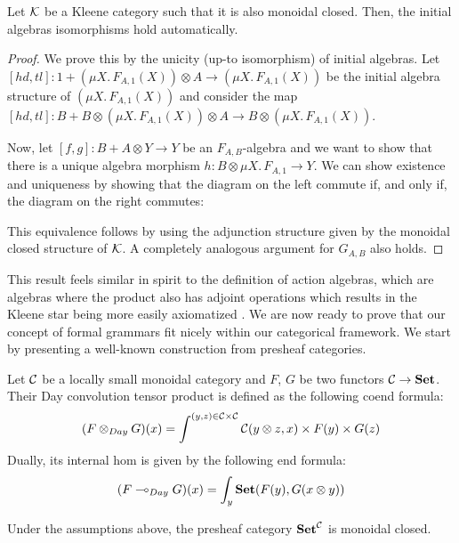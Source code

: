 \documentclass[acmsmall,anonymous,review,screen]{acmart}
\newcommand{\cat}[1]{
  \relax
  \StrLen{#1}[\arglength]
  \ifnum\arglength=1
  \mathcal{#1}
  \else
  \mathbf{#1}
  \fi
}
\newcommand{\Set}{\cat{Set}}
\newcommand{\lto}{\multimap}
\begin{document}
\begin{theorem}
  \label{th:kleeneclosed}
  Let $\cat{K}$ be a Kleene category such that it is also monoidal
  closed.  Then, the initial algebras isomorphisms hold automatically.
\end{theorem}
\begin{proof}
  We prove this by the unicity (up-to isomorphism) of initial
  algebras. Let $[hd, tl]: 1 + (\mu X.\, F_{A, 1}(X)) \otimes A \to
  (\mu X.\, F_{A, 1}(X))$ be the initial algebra structure of $(\mu
  X.\, F_{A, 1}(X))$ and consider the map $[hd, tl] : B + B \otimes
  (\mu X.\, F_{A, 1}(X)) \otimes A \to B\otimes (\mu X.\, F_{A,
    1}(X))$.

  Now, let $[f,g] : B + A \otimes Y \to Y$ be an $F_{A,B}$-algebra and
  we want to show that there is a unique algebra morphism $h : B
  \otimes \mu X.\, F_{A,1} \to Y$. We can show existence and uniqueness
  by showing that the diagram on the left commute if, and only if,
  the diagram on the right commutes:

  This equivalence follows by using the adjunction structure given
  by the monoidal closed structure of $\cat{K}$. A completely analogous
  argument for $G_{A,B}$ also holds.
\end{proof}

This result feels similar in spirit to the definition of action
algebras, which are algebras where the product also has adjoint
operations which results in the Kleene star being more easily
axiomatized \cite{kozen1994}. We are now ready to prove that our
concept of formal grammars fit nicely within our categorical
framework. We start by presenting a well-known construction
from presheaf categories.

\begin{definition}
  Let $\cat{C}$ be a locally small monoidal category and $F$, $G$ be
  two functors $\cat{C} \to \Set$. Their Day convolution tensor
  product is defined as the following coend formula:
  \[
  (F \otimes_{Day} G)(x) = \int^{(y,z) \in \cat{C}\times\cat{C}}\cat{C}(y\otimes z, x) \times F(y) \times G(z) 
  \]
  Dually, its internal hom is given by the following end formula:
  \[
  (F \lto_{Day} G)(x) = \int_{y} \Set(F(y), G(x \otimes y))
  \]
\end{definition}

\begin{lemma}
  Under the assumptions above, the presheaf category $\Set^{\cat{C}}$ is
  monoidal closed.
\end{lemma}
\end{document}

